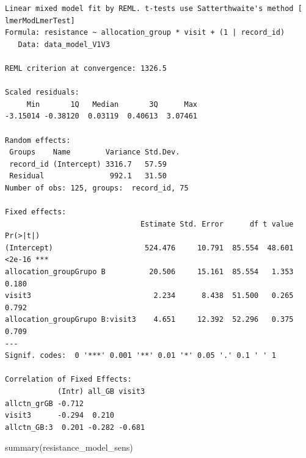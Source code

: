 \documentclass[
  letterpaper,
  DIV=11,
  numbers=noendperiod]{scrartcl}
\newenvironment{Shaded}{\begin{snugshade}}{\end{snugshade}}
\newcommand{\FunctionTok}[1]{\textcolor[rgb]{0.28,0.35,0.67}{#1}}
\newcommand{\NormalTok}[1]{\textcolor[rgb]{0.00,0.23,0.31}{#1}}
\begin{document}
\begin{verbatim}
Linear mixed model fit by REML. t-tests use Satterthwaite's method [
lmerModLmerTest]
Formula: resistance ~ allocation_group * visit + (1 | record_id)
   Data: data_model_V1V3

REML criterion at convergence: 1326.5

Scaled residuals: 
     Min       1Q   Median       3Q      Max 
-3.15014 -0.38120  0.03119  0.40613  3.07461 

Random effects:
 Groups    Name        Variance Std.Dev.
 record_id (Intercept) 3316.7   57.59   
 Residual               992.1   31.50   
Number of obs: 125, groups:  record_id, 75

Fixed effects:
                               Estimate Std. Error      df t value Pr(>|t|)    
(Intercept)                     524.476     10.791  85.554  48.601   <2e-16 ***
allocation_groupGrupo B          20.506     15.161  85.554   1.353    0.180    
visit3                            2.234      8.438  51.500   0.265    0.792    
allocation_groupGrupo B:visit3    4.651     12.392  52.296   0.375    0.709    
---
Signif. codes:  0 '***' 0.001 '**' 0.01 '*' 0.05 '.' 0.1 ' ' 1

Correlation of Fixed Effects:
            (Intr) all_GB visit3
allctn_grGB -0.712              
visit3      -0.294  0.210       
allctn_GB:3  0.201 -0.282 -0.681
\end{verbatim}

\begin{Shaded}
\begin{Highlighting}[]
\FunctionTok{summary}\NormalTok{(resistance\_model\_sens)}
\end{Highlighting}
\end{Shaded}
\end{document}
